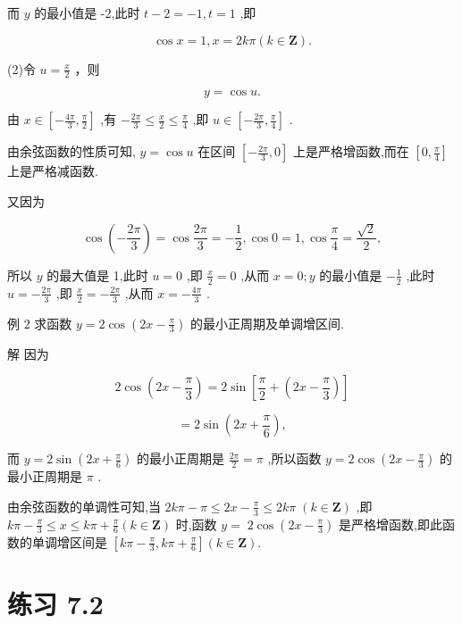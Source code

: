 \documentclass[10pt]{article}
\begin{document}
而 \(y\) 的最小值是 -2,此时 \(t - 2 =  - 1,t = 1\) ,即

\[
\cos x = 1,x = {2k\pi }\left( {k \in  \mathbf{Z}}\right) .
\]

(2)令 \(u = \frac{x}{2}\) ，则

\[
y = \cos u.
\]

由 \(x \in  \left\lbrack  {-\frac{4\pi }{3},\frac{\pi }{2}}\right\rbrack\) ,有 \(- \frac{2\pi }{3} \leq  \frac{x}{2} \leq  \frac{\pi }{4}\) ,即 \(u \in  \left\lbrack  {-\frac{2\pi }{3},\frac{\pi }{4}}\right\rbrack\) .

由余弦函数的性质可知, \(y = \cos u\) 在区间 \(\left\lbrack  {-\frac{2\pi }{3},0}\right\rbrack\) 上是严格增函数,而在 \(\left\lbrack  {0,\frac{\pi }{4}}\right\rbrack\) 上是严格减函数.

又因为

\[
\cos \left( {-\frac{2\pi }{3}}\right)  = \cos \frac{2\pi }{3} =  - \frac{1}{2},\cos 0 = 1,\cos \frac{\pi }{4} = \frac{\sqrt{2}}{2},
\]

所以 \(y\) 的最大值是 1,此时 \(u = 0\) ,即 \(\frac{x}{2} = 0\) ,从而 \(x = 0;y\) 的最小值是 \(- \frac{1}{2}\) ,此时 \(u =  - \frac{2\pi }{3}\) ,即 \(\frac{x}{2} =  - \frac{2\pi }{3}\) ,从而 \(x =  - \frac{4\pi }{3}\) .

例 2 求函数 \(y = 2\cos \left( {{2x} - \frac{\pi }{3}}\right)\) 的最小正周期及单调增区间.

解 因为

\[
2\cos \left( {{2x} - \frac{\pi }{3}}\right)  = 2\sin \left\lbrack  {\frac{\pi }{2} + \left( {{2x} - \frac{\pi }{3}}\right) }\right\rbrack
\]

\[
= 2\sin \left( {{2x} + \frac{\pi }{6}}\right) ,
\]

而 \(y = 2\sin \left( {{2x} + \frac{\pi }{6}}\right)\) 的最小正周期是 \(\frac{2\pi }{2} = \pi\) ,所以函数 \(y = 2\cos \left( {{2x} - \frac{\pi }{3}}\right)\) 的最小正周期是 \(\pi\) .

由余弦函数的单调性可知,当 \({2k\pi } - \pi  \leq  {2x} - \frac{\pi }{3} \leq  {2k\pi } \; \left( {k \in  \mathbf{Z}}\right)\) ,即 \({k\pi } - \frac{\pi }{3} \leq  x \leq  {k\pi } + \frac{\pi }{6}\left( {k \in  \mathbf{Z}}\right)\) 时,函数 \(y = \; 2\cos \left( {{2x} - \frac{\pi }{3}}\right)\) 是严格增函数,即此函数的单调增区间是 \(\left\lbrack  {{k\pi } - \frac{\pi }{3},{k\pi } + \frac{\pi }{6}}\right\rbrack  \left( {k \in  \mathbf{Z}}\right) .\)

\section*{练习 7.2}
\end{document}
